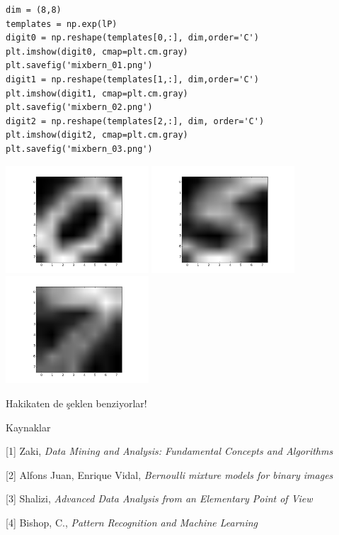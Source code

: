 \documentclass[12pt,fleqn]{article}\usepackage{../../common}
\begin{document}
\begin{verbatim}
dim = (8,8)
templates = np.exp(lP)
digit0 = np.reshape(templates[0,:], dim,order='C')
plt.imshow(digit0, cmap=plt.cm.gray)
plt.savefig('mixbern_01.png')
digit1 = np.reshape(templates[1,:], dim,order='C')
plt.imshow(digit1, cmap=plt.cm.gray)
plt.savefig('mixbern_02.png')
digit2 = np.reshape(templates[2,:], dim, order='C')
plt.imshow(digit2, cmap=plt.cm.gray)
plt.savefig('mixbern_03.png')
\end{verbatim}

\includegraphics[height=4cm]{mixbern_01.png}
\includegraphics[height=4cm]{mixbern_02.png}
\includegraphics[height=4cm]{mixbern_03.png}

Hakikaten de şeklen benziyorlar!

Kaynaklar

[1] Zaki, {\em Data Mining and Analysis: Fundamental Concepts and Algorithms}

[2] Alfons Juan, Enrique Vidal, {\em Bernoulli mixture models for binary images}

[3] Shalizi, {\em Advanced Data Analysis from an Elementary Point of View}

[4] Bishop, C., {\em Pattern Recognition and Machine Learning}
\end{document}

